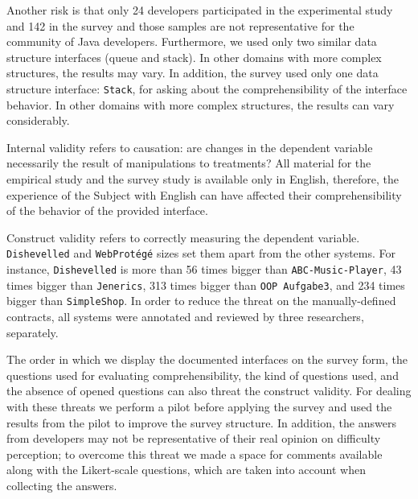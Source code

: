 Another risk is that only 24 developers participated in the experimental study
and 142 in the survey and those samples are not representative for the community
of Java developers. Furthermore, we used only two similar data structure interfaces (queue and stack). In other domains with more complex structures, the results
may vary. In addition, the survey used only one data structure interface:
\texttt{Stack}, for asking about the comprehensibility of the interface behavior.
In other domains with more complex structures, the results can vary considerably.


Internal validity refers to causation: are changes in the dependent variable
necessarily the result of manipulations to treatments? All material for the
empirical study and the survey study is available only in English, therefore,
the experience of the Subject with English can have affected their
comprehensibility of the behavior of the provided interface.

Construct validity refers to correctly measuring the
dependent variable. \texttt{Dishevelled} and
\texttt{WebProt\'{e}g\'{e}} sizes set them apart from the other systems.
For instance, \texttt{Dishevelled} is more than 56 times bigger than \texttt{ABC-Music-Player}, 43
times bigger than \texttt{Jenerics}, 313 times bigger than \texttt{OOP Aufgabe3}, and 234 times
bigger than \texttt{SimpleShop}.
In order to reduce the threat on the manually-defined contracts,
all systems were annotated and reviewed by three researchers, separately.


The order in which we display the documented
interfaces on the survey form, the questions used for evaluating
comprehensibility, the kind of questions used, and the absence of opened questions
can also threat the construct validity. For dealing with these threats we
perform a pilot before applying the survey and used the results from the pilot
to improve the survey structure. In addition, the answers from developers may not be
representative of their real opinion on difficulty perception; to overcome this
threat we made a space for comments available along with the Likert-scale
questions, which are taken into account when collecting the answers.
